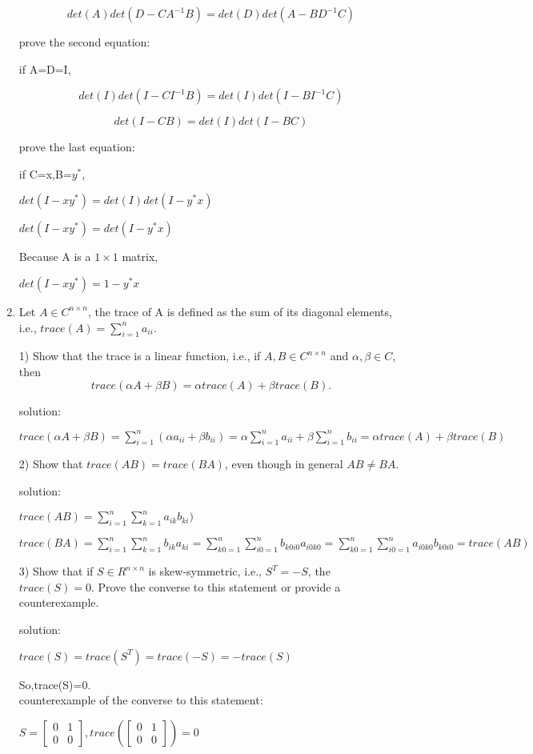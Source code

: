 \documentclass{article}
\begin{document}
\begin{enumerate}
		 \[det(A)det(D-CA^{-1}B)=det(D)det(A-BD^{-1}C)\]
		
		prove the second equation:$ $
		
		if A=D=I,
		
		\[det(I)det(I-CI^{-1}B)=det(I)det(I-BI^{-1}C)\]
		
		\[det(I-CB)=det(I)det(I-BC)\]
		
		prove the last equation:$ $
		
		if C=x,B=$y^{*}$,
		
		$det(I-xy^{*})=det(I)det(I- y^{*}x)$ 
		
		$det(I-xy^{*})=det(I-y^{*}x)$
		
		Because A is a $1 \times 1$ matrix,
		
		$det(I-xy^{*})=1-y^{*}x$
		
		\item%
		Let $A \in C^{n \times n}$, the trace of A is defined as the sum of its diagonal elements, i.e., $trace(A)=\sum_{i=1}^n{a_{ii}}$.
		
		1) Show that the trace is a linear function, i.e., if $A,B \in C^{n \times n}$ and $\alpha,\beta \in C$, then
		\[ trace(\alpha A+\beta B)=\alpha trace(A)+\beta trace(B).\]
		
		solution:$ $ 
		
			$trace(\alpha A+\beta B)=\sum_{i=1}^n{(\alpha a_{ii}+\beta b_{ii})}=\alpha \sum_{i=1}^n{a_{ii}}+\beta \sum_{i=1}^n{b_{ii}}=\alpha trace(A)+\beta trace(B)$
		
		2) Show that $trace(AB)=trace(BA)$, even though in general $AB \neq BA$.
		
		solution:$ $
		
			$trace(AB)=\sum_{i=1}^n\sum_{k=1}^n{ a_{ik}b_{ki} })$
			
			$trace(BA)=\sum_{i=1}^n\sum_{k=1}^n{ b_{ik}a_{ki} }
			=\sum_{k0=1}^n\sum_{i0=1}^n{ b_{k0i0}a_{i0k0} }
			=\sum_{k0=1}^n\sum_{i0=1}^n{ a_{i0k0}b_{k0i0} }
			=trace(AB)$
		
		3) Show that if $S \in R^{n \times n}$ is skew-symmetric, i.e., $S^T=-S$, the $trace(S)=0$. Prove the converse to this statement or provide a counterexample.
		
		solution:$ $
		
		$trace(S)=trace(S^T)=trace(-S)=-trace(S)$
		
		So,trace(S)=0.
		\[\]counterexample of the converse to this statement:
		
		$S=\begin{bmatrix} 0&1\\0&0 \end{bmatrix},trace(\begin{bmatrix} 0&1\\0&0 \end{bmatrix})=0$
		

\end{enumerate}
\end{document}
